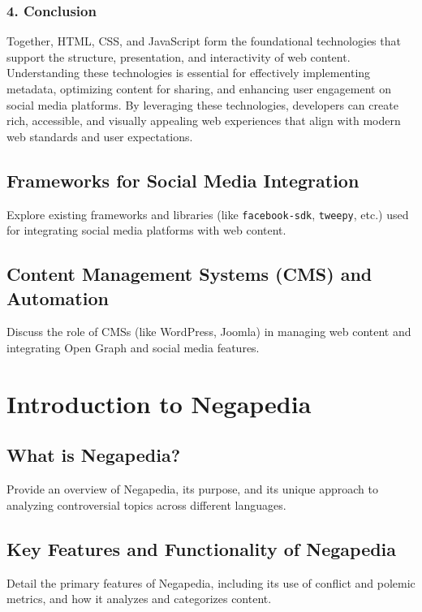\subsubsection{4. Conclusion}

Together, HTML, CSS, and JavaScript form the foundational technologies that support the structure, presentation, and interactivity of web content. Understanding these technologies is essential for effectively implementing metadata, optimizing content for sharing, and enhancing user engagement on social media platforms. By leveraging these technologies, developers can create rich, accessible, and visually appealing web experiences that align with modern web standards and user expectations.

\subsection{Frameworks for Social Media Integration}
\label{subsec:frameworks_for_social_media_integration}
Explore existing frameworks and libraries (like \texttt{facebook-sdk}, \texttt{tweepy}, etc.) used for integrating social media platforms with web content.

\subsection{Content Management Systems (CMS) and Automation}
\label{subsec:content_management_systems_cms_and_automation}
Discuss the role of CMSs (like WordPress, Joomla) in managing web content and integrating Open Graph and social media features.

\section{Introduction to Negapedia}
\label{sec:introduction_to_negapedia}

\subsection{What is Negapedia?}
\label{subsec:what_is_negapedia}
Provide an overview of Negapedia, its purpose, and its unique approach to analyzing controversial topics across different languages.

\subsection{Key Features and Functionality of Negapedia}
\label{subsec:key_features_and_functionality_of_negapedia}
Detail the primary features of Negapedia, including its use of conflict and polemic metrics, and how it analyzes and categorizes content.

